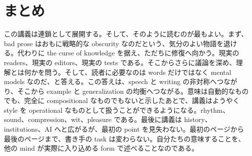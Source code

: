 \section{まとめ}

この講義は連鎖として展開する。そして、そのように読むのが最もよい。まず、bad prose はおもに戦略的な obscurity なのだという、気分のよい物語を退ける。代わりに the curse of knowledge を据え、ただちに修復へ向かう。現実の readers、現実の editors、現実の tests である。そこからさらに議論を深め、理解とは何かを問う。そして、読者に必要なのは words だけではなく mental models なのだ、と答える。この答えは、speech と writing の非対称へつながり、そこから example と generalization の均衡へつながる。意味は自動的なものでも、完全に compositional なものでもないと示したあとで、講義はようやく style を operational なものとして扱うことができるようになる。rhythm、sound、compression、wit、pleasure である。最後に講義は history、institutions、AI へと広がるが、最初の point を見失わない。最初のページから最後のページまで、書き手の task は変わらない。自分たちの意味することを、他の mind が実際に入り込める form で述べることなのである。